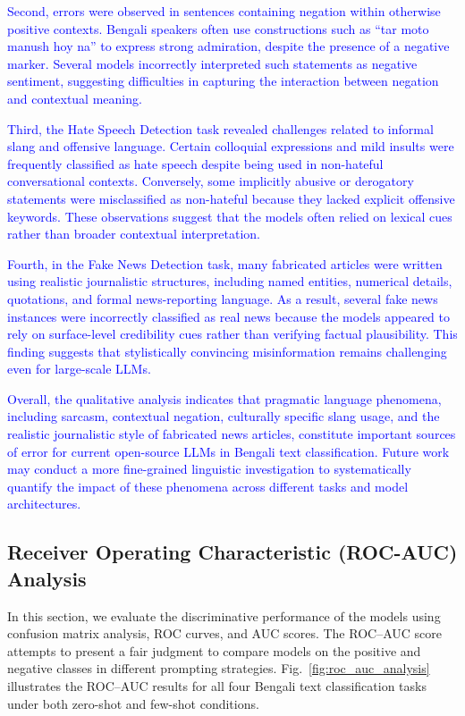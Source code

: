 \documentclass[10pt,letterpaper]{article}
\newcommand{\banglaNegationExample}{tar moto manush hoy na}
\newcommand{\banglaNegationExample}{{\bengalifont তার মতো মানুষ হয় না}}
\newcommand{\rev}[1]{\textcolor{blue}{#1}}
\begin{document}
\rev{Second, errors were observed in sentences containing negation within otherwise positive contexts. Bengali speakers often use constructions such as ``\banglaNegationExample'' to express strong admiration, despite the presence of a negative marker. Several models incorrectly interpreted such statements as negative sentiment, suggesting difficulties in capturing the interaction between negation and contextual meaning.}

\rev{Third, the Hate Speech Detection task revealed challenges related to informal slang and offensive language. Certain colloquial expressions and mild insults were frequently classified as hate speech despite being used in non-hateful conversational contexts. Conversely, some implicitly abusive or derogatory statements were misclassified as non-hateful because they lacked explicit offensive keywords. These observations suggest that the models often relied on lexical cues rather than broader contextual interpretation.}

\rev{Fourth, in the Fake News Detection task, many fabricated articles were written using realistic journalistic structures, including named entities, numerical details, quotations, and formal news-reporting language. As a result, several fake news instances were incorrectly classified as real news because the models appeared to rely on surface-level credibility cues rather than verifying factual plausibility. This finding suggests that stylistically convincing misinformation remains challenging even for large-scale LLMs.}

\rev{Overall, the qualitative analysis indicates that pragmatic language phenomena, including sarcasm, contextual negation, culturally specific slang usage, and the realistic journalistic style of fabricated news articles, constitute important sources of error for current open-source LLMs in Bengali text classification. Future work may conduct a more fine-grained linguistic investigation to systematically quantify the impact of these phenomena across different tasks and model architectures.}





\subsection*{Receiver Operating Characteristic (ROC-AUC) Analysis}
\label{sec:roc_auc_analysis}

In this section, we evaluate the discriminative performance of the models using confusion matrix analysis, ROC curves, and AUC scores. The ROC–AUC score attempts to present a fair judgment to compare models on the positive and negative classes in different prompting strategies. Fig.~\ref{fig:roc_auc_analysis} illustrates the ROC–AUC results for all four Bengali text classification tasks under both zero-shot and few-shot conditions.
\end{document}
